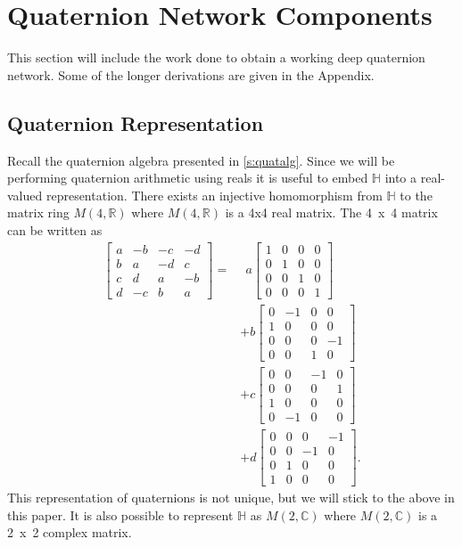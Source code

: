 \section{Quaternion Network Components}
This section will include the work done to obtain a working deep quaternion network. 
Some of the longer derivations are given in the Appendix.

\subsection{Quaternion Representation}
Recall the quaternion algebra presented in \ref{s:quatalg}.
Since we will be performing quaternion arithmetic using reals it is useful to embed $\mathbb{H}$ into a real-valued representation.
There exists an injective homomorphism from $\mathbb{H}$ to the matrix ring $M(4,\mathbb{R})$ where $M(4,\mathbb{R})$ is a 4x4 real matrix.
The 4~x~4 matrix can be written as
\begin{align}
\begin{bmatrix}
 a & -b & -c & -d \\ 
 b & a & -d & c \\
 c & d & a & -b \\
 d & -c & b & a 
\end{bmatrix}= &~~a
\begin{bmatrix}
 1 & 0 & 0 & 0 \\ 
 0 & 1 & 0 & 0 \\
 0 & 0 & 1 & 0 \\
 0 & 0 & 0 & 1 
\end{bmatrix}
\nonumber \\ &+ b 
\begin{bmatrix}
 0 & -1 & 0 & 0 \\ 
 1 & 0 & 0 & 0 \\
 0 & 0 & 0 & -1 \\
 0 & 0 & 1 & 0 
\end{bmatrix}
\nonumber \\ &+ c
\begin{bmatrix}
 0 & 0 & -1 & 0 \\ 
 0 & 0 & 0 & 1 \\
 1 & 0 & 0 & 0 \\
 0 & -1 & 0 & 0 
\end{bmatrix}
\nonumber \\ &+ d
\begin{bmatrix}
 0 & 0 & 0 & -1 \\ 
 0 & 0 & -1 & 0 \\
 0 & 1 & 0 & 0 \\
 1 & 0 & 0 & 0 
\end{bmatrix}.
\label{eq:m4r}
\end{align}
This representation of quaternions is not unique, but we will stick to the above in this paper.
It is also possible to represent $\mathbb{H}$ as $M(2,\mathbb{C})$ where $M(2,\mathbb{C})$ is a 2~x~2 complex matrix.

